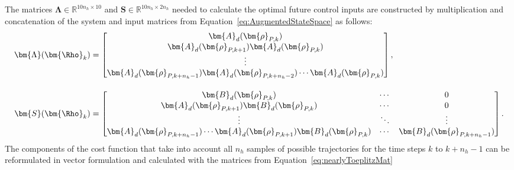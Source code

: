 The matrices \( \bm{\Lambda} \in \mathbb{R}^{10n_h \times 10}\) and \( \bm{S}  \in \mathbb{R}^{10n_h \times 2n_h} \) needed to calculate the optimal future control inputs are constructed by multiplication and concatenation of the system and input matrices from Equation~\eqref{eq:AugmentedStateSpace} as follows: %
\begin{equation} \label{eq:nearlyToeplitzMat}
\begin{aligned}
    \bm{\Lambda}(\bm{\Rho}_k) &= \begin{bmatrix}
        \bm{A}_d(\bm{\rho}_{P,k})  \\
        \bm{A}_d(\bm{\rho}_{P,k+1}) \bm{A}_d(\bm{\rho}_{P,k})  \\
        \vdots\\
        \bm{A}_d(\bm{\rho}_{P,k+n_h-1}) \bm{A}_d(\bm{\rho}_{P,k+n_h-2}) \cdots \bm{A}_d(\bm{\rho}_{P,k}) 
    \end{bmatrix}, \\[10pt]
    \bm{S}(\bm{\Rho}_k) &= 
    \begin{bmatrix}
        \bm{B}_d(\bm{\rho}_{P,k})  & \cdots & 0 \\
        \bm{A}_d(\bm{\rho}_{P,k+1}) \bm{B}_d(\bm{\rho}_{P,k}) & \cdots & 0 \\
        \vdots &  \ddots & \vdots \\
        \bm{A}_d(\bm{\rho}_{P,k+n_h-1}) \cdots \bm{A}_d(\bm{\rho}_{P,k+1}) \bm{B}_d(\bm{\rho}_{P,k}) & \cdots & \bm{B}_d(\bm{\rho}_{P,k+n_h-1})
    \end{bmatrix}.
     \end{aligned}
\end{equation}
The components of the cost function that take into account all $n_h$ samples of possible trajectories for the time steps $k$ to $k + n_h-1$ can be reformulated in vector formulation and calculated with the matrices from Equation~\eqref{eq:nearlyToeplitzMat} 

